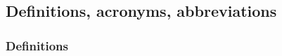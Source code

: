   \subsection{Definitions, acronyms, abbreviations}

    \subsubsection{Definitions}
    \label{sec:definitions}

      \begin{description}
        \item[]

\end{description}
